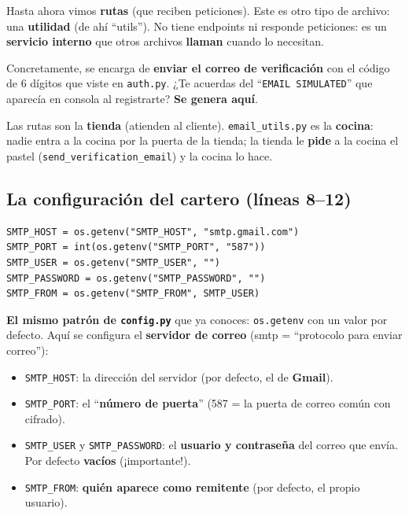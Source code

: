 \documentclass[11pt,a4paper]{article}
\begin{document}
Hasta ahora vimos \textbf{rutas} (que reciben peticiones). Este es otro tipo de archivo: una
\textbf{utilidad} (de ahí ``utils''). No tiene endpoints ni responde peticiones: es un
\textbf{servicio interno} que otros archivos \textbf{llaman} cuando lo necesitan.

Concretamente, se encarga de \textbf{enviar el correo de verificación} con el código de 6
dígitos que viste en \texttt{auth.py}. ¿Te acuerdas del ``\texttt{EMAIL SIMULATED}'' que
aparecía en consola al registrarte? \textbf{Se genera aquí}.

\begin{analogia}
Las rutas son la \textbf{tienda} (atienden al cliente). \texttt{email\_utils.py} es la
\textbf{cocina}: nadie entra a la cocina por la puerta de la tienda; la tienda le \textbf{pide}
a la cocina el pastel (\texttt{send\_verification\_email}) y la cocina lo hace.
\end{analogia}

\subsection{La configuración del cartero (líneas 8--12)}

\begin{lstlisting}
SMTP_HOST = os.getenv("SMTP_HOST", "smtp.gmail.com")
SMTP_PORT = int(os.getenv("SMTP_PORT", "587"))
SMTP_USER = os.getenv("SMTP_USER", "")
SMTP_PASSWORD = os.getenv("SMTP_PASSWORD", "")
SMTP_FROM = os.getenv("SMTP_FROM", SMTP_USER)
\end{lstlisting}

\textbf{El mismo patrón de \texttt{config.py}} que ya conoces: \texttt{os.getenv} con un valor
por defecto. Aquí se configura el \textbf{servidor de correo} (smtp = ``protocolo para enviar
correo''):

\begin{itemize}
    \item \texttt{SMTP\_HOST}: la dirección del servidor (por defecto, el de \textbf{Gmail}).
    \item \texttt{SMTP\_PORT}: el ``\textbf{número de puerta}'' (587 = la puerta de correo
    común con cifrado).
    \item \texttt{SMTP\_USER} y \texttt{SMTP\_PASSWORD}: el \textbf{usuario y contraseña} del
    correo que envía. Por defecto \textbf{vacíos} (¡importante!).
    \item \texttt{SMTP\_FROM}: \textbf{quién aparece como remitente} (por defecto, el propio
    usuario).
\end{itemize}
\end{document}
